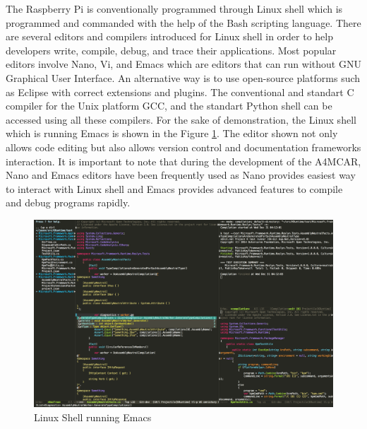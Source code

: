 The Raspberry Pi is conventionally programmed through Linux shell which is programmed and commanded with the help of the Bash scripting language. There are several editors and compilers introduced for Linux shell in order to help developers write, compile, debug, and trace their applications. Most popular editors involve Nano, Vi, and Emacs which are editors that can run without GNU Graphical User Interface. An alternative way is to use open-source platforms such as Eclipse with correct extensions and plugins. The conventional and standart C compiler for the Unix platform GCC, and the standart Python shell can be accessed using all these compilers. For the sake of demonstration, the Linux shell which is running Emacs is shown in the Figure \ref{fig:linuxeditors}. The editor shown not only allows code editing but also allows version control and documentation frameworks interaction. It is important to note that during the development of the A4MCAR, Nano and Emacs editors have been frequently used as Nano provides easiest way to interact with Linux shell and Emacs provides advanced features to compile and debug programs rapidly.
\begin{figure}[!ht]
	\centering
	\captionsetup{justification=centering}
	\includegraphics[width=\textwidth]{content/images/linuxeditors.png}
	\caption{Linux Shell running Emacs}
	\label{fig:linuxeditors}
\end{figure}
